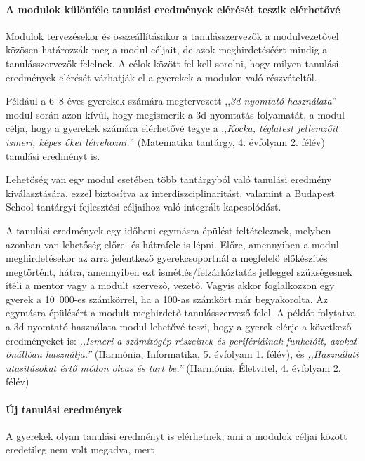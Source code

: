 \paragraph{A modulok különféle tanulási eredmények elérését teszik elérhetővé}

Modulok tervezésekor és összeállításakor a tanulásszervezők a modulvezetővel közösen határozzák meg a modul céljait, de azok meghirdetéséért mindig a tanulásszervezők felelnek. A célok között fel kell sorolni, hogy milyen tanulási eredmények elérését várhatják el a gyerekek a modulon való részvételtől.

Például a 6--8 éves gyerekek számára megtervezett ,,\emph{3d nyomtató használata}'' modul során azon kívül, hogy megismerik a 3d nyomtatás folyamatát, a modul célja, hogy a gyerekek számára elérhetővé tegye a ,,\emph{Kocka, téglatest jellemzőit ismeri, képes őket létrehozni.}'' (Matematika tantárgy, 4. évfolyam 2. félév) tanulási eredményt is.

Lehetőség van egy modul esetében több tantárgyból való tanulási eredmény kiválasztására, ezzel biztosítva az interdiszciplinaritást, valamint a Budapest School tantárgyi fejlesztési céljaihoz való integrált kapcsolódást.

A tanulási eredmények egy időbeni egymásra épülést feltételeznek, melyben azonban van lehetőség előre- és hátrafele is lépni. Előre, amennyiben a modul meghirdetésekor az arra jelentkező gyerekcsoportnál a megfelelő előkészítés megtörtént, hátra, amennyiben ezt ismétlés/felzárkóztatás jelleggel szükségesnek ítéli a mentor vagy a modult szervező, vezető. Vagyis akkor foglalkozzon egy gyerek a 10~000-es számkörrel, ha a 100-as számkört már begyakorolta. Az egymásra épülésért a modult meghirdető tanulásszervező felel. A példát folytatva a 3d nyomtató használata modul lehetővé teszi, hogy a gyerek elérje a következő eredményeket is: \emph{,,Ismeri a számítógép
      részeinek és perifériáinak funkcióit, azokat önállóan használja.''}
(Harmónia, Informatika, 5. évfolyam 1. félév), és  \emph{,,Használati utasításokat
      értő módon olvas és tart be.''} (Harmónia, Életvitel, 4. évfolyam 2. félév)

\paragraph{Új tanulási eredmények}

A gyerekek olyan tanulási eredményt is elérhetnek, ami a modulok céljai között eredetileg nem volt megadva, mert

